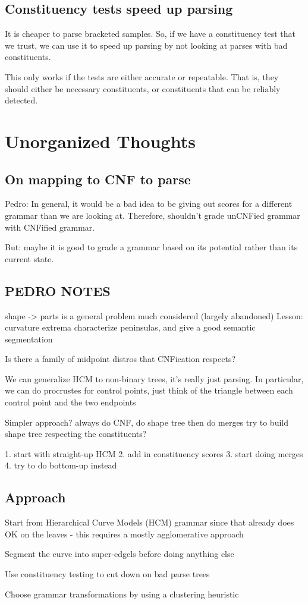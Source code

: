 \documentclass{article}
\begin{document}
\subsection{Constituency tests speed up parsing}
It is cheaper to parse bracketed samples. So, if we have a
constituency test that we trust, we can use it to speed up parsing by
not looking at parses with bad constituents.

This only works if the tests are either accurate or repeatable. That
is, they should either be necessary constituents, or constituents that
can be reliably detected.

\section{Unorganized Thoughts}



\subsection{On mapping to CNF to parse}

Pedro: In general, it would be a bad idea to be giving out scores for
a different grammar than we are looking at. Therefore, shouldn't grade
unCNFied grammar with CNFified grammar.

But: maybe it is good to grade a grammar based on its potential rather
than its current state. 

\subsection{PEDRO NOTES}

shape -> parts is a general problem much considered (largely abandoned)
Lesson: curvature extrema characterize peninsulas, and give a good
semantic segmentation

Is there a family of midpoint distros that CNFication respects?

We can generalize HCM to non-binary trees, it's really just
parsing. In particular, we can do procrustes for control points, just
think of the triangle between each control point and the two endpoints

Simpler approach?
always do CNF, do shape tree
then do merges
try to build shape tree respecting the constituents?

1. start with straight-up HCM
2. add in constituency scores
3. start doing merges
4. try to do bottom-up instead

\subsection{Approach}
\bitem
\item Start from Hierarchical Curve Models (HCM) grammar since that
  already does OK on the leaves - this requires a mostly agglomerative
  approach
\item Segment the curve into super-edgels before doing anything else
\item Use constituency testing to cut down on bad parse trees
\item Choose grammar transformations by using a clustering heuristic
\eitem
\end{document}

